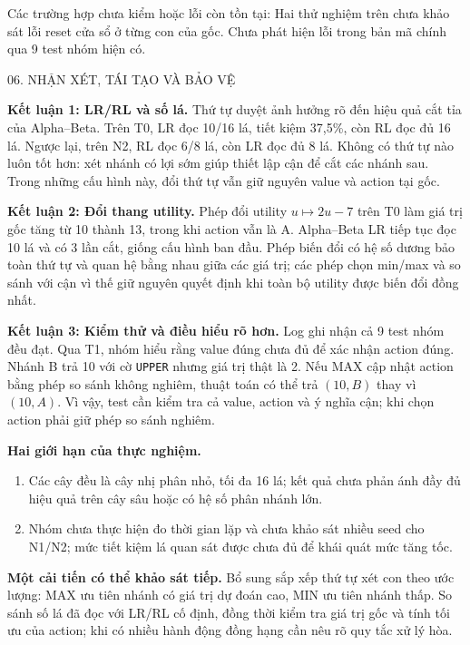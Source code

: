 \documentclass[11pt,a4paper]{article}
\newcommand{\head}[1]{\par\Needspace{3\baselineskip}\medskip{\large\sffamily\bfseries\color{Ink}#1}\par}
\newcommand{\pagehead}[1]{\clearpage\begin{tcolorbox}[colback=Ink,colframe=Ink,coltext=white,fontupper=\sffamily\large\bfseries,arc=1mm]#1\end{tcolorbox}}
\begin{document}
Các trường hợp chưa kiểm hoặc lỗi còn tồn tại: Hai thử nghiệm trên chưa khảo sát lỗi reset cửa sổ ở từng con của gốc. Chưa phát hiện lỗi trong bản mã chính qua 9 test nhóm hiện có.\par\medskip
\pagehead{06. NHẬN XÉT, TÁI TẠO VÀ BẢO VỆ}
\head{9. Ba kết luận có minh chứng}
\textbf{Kết luận 1: LR/RL và số lá.}
Thứ tự duyệt ảnh hưởng rõ đến hiệu quả cắt tỉa của Alpha--Beta. Trên T0, LR đọc 10/16 lá, tiết kiệm 37,5\%, còn RL đọc đủ 16 lá. Ngược lại, trên N2, RL đọc 6/8 lá, còn LR đọc đủ 8 lá. Không có thứ tự nào luôn tốt hơn: xét nhánh có lợi sớm giúp thiết lập cận để cắt các nhánh sau. Trong những cấu hình này, đổi thứ tự vẫn giữ nguyên value và action tại gốc.\par\smallskip
\textbf{Kết luận 2: Đổi thang utility.}
Phép đổi utility $u\mapsto2u-7$ trên T0 làm giá trị gốc tăng từ 10 thành 13, trong khi action vẫn là A. Alpha--Beta LR tiếp tục đọc 10 lá và có 3 lần cắt, giống cấu hình ban đầu. Phép biến đổi có hệ số dương bảo toàn thứ tự và quan hệ bằng nhau giữa các giá trị; các phép chọn min/max và so sánh với cận vì thế giữ nguyên quyết định khi toàn bộ utility được biến đổi đồng nhất.\par\smallskip
\textbf{Kết luận 3: Kiểm thử và điều hiểu rõ hơn.}
Log ghi nhận cả 9 test nhóm đều đạt. Qua T1, nhóm hiểu rằng value đúng chưa đủ để xác nhận action đúng. Nhánh B trả 10 với cờ \texttt{UPPER} nhưng giá trị thật là 2. Nếu MAX cập nhật action bằng phép so sánh không nghiêm, thuật toán có thể trả $(10,B)$ thay vì $(10,A)$. Vì vậy, test cần kiểm tra cả value, action và ý nghĩa cận; khi chọn action phải giữ phép so sánh nghiêm.\par\smallskip
\textbf{Hai giới hạn của thực nghiệm.}
\begin{enumerate}[topsep=1pt,itemsep=1pt,partopsep=0pt,parsep=0pt]
\item Các cây đều là cây nhị phân nhỏ, tối đa 16 lá; kết quả chưa phản ánh đầy đủ hiệu quả trên cây sâu hoặc có hệ số phân nhánh lớn.
\item Nhóm chưa thực hiện đo thời gian lặp và chưa khảo sát nhiều seed cho N1/N2; mức tiết kiệm lá quan sát được chưa đủ để khái quát mức tăng tốc.
\end{enumerate}
\textbf{Một cải tiến có thể khảo sát tiếp.}
Bổ sung sắp xếp thứ tự xét con theo ước lượng: MAX ưu tiên nhánh có giá trị dự đoán cao, MIN ưu tiên nhánh thấp. So sánh số lá đã đọc với LR/RL cố định, đồng thời kiểm tra giá trị gốc và tính tối ưu của action; khi có nhiều hành động đồng hạng cần nêu rõ quy tắc xử lý hòa.\par\smallskip
\end{document}
